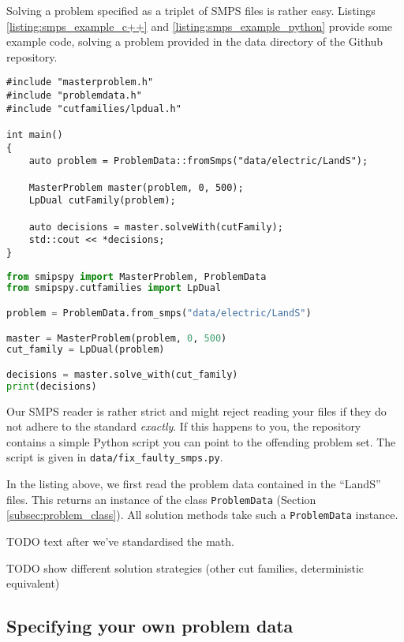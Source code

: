 \documentclass[12pt, english]{article}
\begin{document}
Solving a problem specified as a triplet of SMPS files is rather easy. Listings \ref{listing:smps_example_c++} and \ref{listing:smps_example_python} provide some example code, solving a problem provided in the data directory of the Github repository.
\begin{lstlisting}[caption={Solving an SMPS problem in C++.},
                   label={listing:smps_example_c++}]
#include "masterproblem.h"
#include "problemdata.h"
#include "cutfamilies/lpdual.h"

int main()
{
	auto problem = ProblemData::fromSmps("data/electric/LandS");
	
	MasterProblem master(problem, 0, 500);
	LpDual cutFamily(problem);
	
	auto decisions = master.solveWith(cutFamily);
	std::cout << *decisions;
}
\end{lstlisting}
\begin{lstlisting}[caption={Solving an SMPS problem in Python.},
                   label={listing:smps_example_python},
                   language={Python}]
from smipspy import MasterProblem, ProblemData
from smipspy.cutfamilies import LpDual

problem = ProblemData.from_smps("data/electric/LandS")

master = MasterProblem(problem, 0, 500)
cut_family = LpDual(problem)

decisions = master.solve_with(cut_family)
print(decisions)
\end{lstlisting}
Our SMPS reader is rather strict and might reject reading your files if they do not adhere to the standard \textit{exactly}. If this happens to you, the repository contains a simple Python script you can point to the offending problem set. The script is given in \texttt{data/fix\_faulty\_smps.py}.

In the listing above, we first read the problem data contained in the ``LandS'' files. This returns an instance of the class \texttt{ProblemData} (Section \ref{subsec:problem_class}). All solution methods take such a \texttt{ProblemData} instance.

TODO text after we've standardised the math.

TODO show different solution strategies (other cut families, deterministic equivalent)

\subsection{Specifying your own problem data}
\label{subsec:own_data_example}
\end{document}

